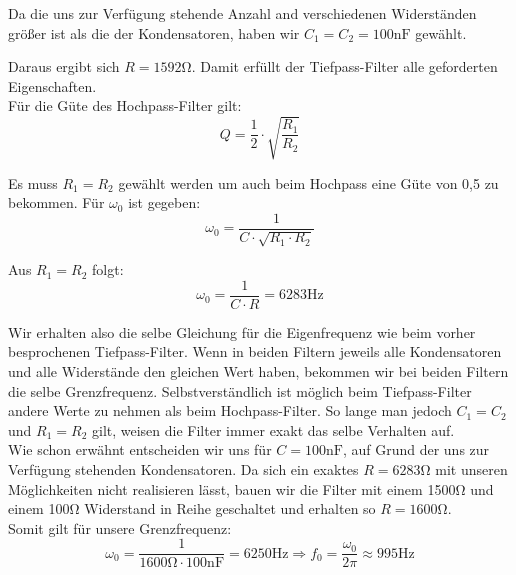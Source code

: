 Da die uns zur Verfügung stehende Anzahl and verschiedenen Widerständen größer ist als die der Kondensatoren, haben wir $C_{1}=C_{2}=100\si{\nano\farad}$ gewählt.

Daraus ergibt sich $R=1592\si{\ohm}$. Damit erfüllt der Tiefpass-Filter alle geforderten Eigenschaften. \\
Für die Güte des Hochpass-Filter gilt:
$$Q=\frac{1}{2}\cdot\sqrt{\frac{R_{1}}{R_{2}}}$$

Es muss $R_{1}=R_{2}$ gewählt werden um auch beim Hochpass eine Güte von 0,5 zu bekommen.
Für $\omega_{0}$ ist gegeben:
$$\omega_{0} = \frac{1}{C\cdot\sqrt{R_{1}\cdot R_{2}}}$$

Aus $R_{1}=R_{2}$ folgt:
$$\omega_{0} = \frac{1}{C\cdot R}=6283\si{\hertz}$$

Wir erhalten also die selbe Gleichung für die Eigenfrequenz wie beim vorher besprochenen Tiefpass-Filter. Wenn in beiden Filtern jeweils alle Kondensatoren und alle Widerstände den gleichen Wert haben, bekommen wir bei beiden Filtern die selbe Grenzfrequenz. Selbstverständlich ist möglich beim Tiefpass-Filter andere Werte zu nehmen als beim Hochpass-Filter. So lange man jedoch $C_{1}=C_{2}$ und $R_{1}=R_{2}$ gilt, weisen die Filter immer exakt das selbe Verhalten auf.\\
Wie schon erwähnt entscheiden wir uns für $C=100\si{\nano\farad}$, auf Grund der uns zur Verfügung stehenden Kondensatoren. Da sich ein exaktes $R=6283\si{\ohm}$ mit unseren Möglichkeiten nicht realisieren lässt, bauen wir die Filter mit einem 1500\si{\ohm} und einem 100\si{\ohm} Widerstand in Reihe geschaltet und erhalten so $R=1600\si{\ohm}$.\\
Somit gilt für unsere Grenzfrequenz:
$$\omega_{0}=\frac{1}{1600\si{\ohm}\cdot 100\si{\nano\farad}}=6250\si{\hertz}\Rightarrow f_{0}=\frac{\omega_{0}}{2\pi}\approx 995\si{\hertz}$$

